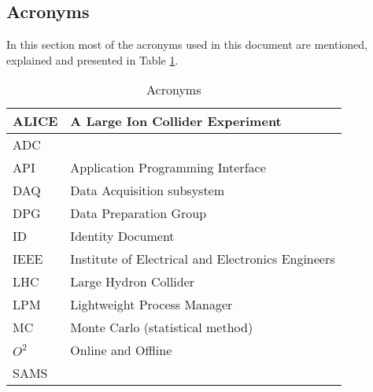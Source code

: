 \subsection{Acronyms} 
In this section most of the acronyms used in this document are mentioned, explained and presented in Table \ref{tab:acronyms}.
\begin{table}[h]
\begin{center}
\begin{longtable}{ll}
    \hline
    ALICE & A Large Ion Collider Experiment\\
    \hline
    ADC & \\
    \hline
    API & Application Programming Interface\\
    \hline
    DAQ & Data Acquisition subsystem \\
    \hline
    DPG & Data Preparation Group\\
    \hline
    ID & Identity Document\\
    \hline
    IEEE & Institute of Electrical and Electronics Engineers\\
    \hline
     LHC  & Large Hydron Collider\\
     \hline
     LPM & Lightweight Process Manager \\
     \hline
     MC & Monte Carlo (statistical method)\\
     \hline
     $O^2$ & Online and Offline\\
     \hline
     SAMS & \\
     \hline
    \end{longtable}
      \caption{Acronyms}
  \label{tab:acronyms}
  \end{center}
  
\end{table}

